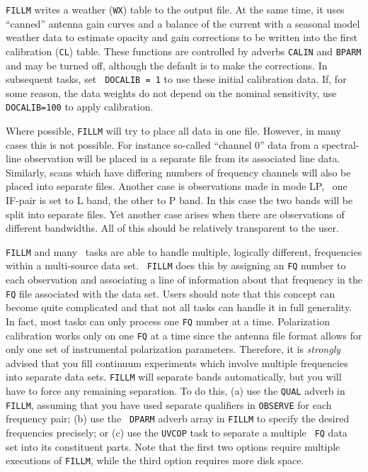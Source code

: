       {\tt FILLM} writes a weather ({\tt WX}) table to the output
file.  At the same time, it uses ``canned''  antenna gain
curves and a balance of the current with a seasonal model weather data
to estimate opacity and gain corrections to be written into the first
calibration ({\tt CL}) table.  These functions are controlled by
adverbs {\tt CALIN} and {\tt BPARM} and may be turned off, although
the default is to make the corrections. In subsequent tasks, set {\tt
DOCALIB = 1} to use these initial calibration data.  If, for some
reason, the data weights do not depend on the nominal sensitivity, use
{\tt DOCALIB=100} to apply calibration.

     Where possible, {\tt FILLM} will try to place all data in one
file.  However, in many cases this is not possible.  For instance
so-called ``channel 0'' data from a spectral-line observation will be
placed in a separate file from its associated line data.  Similarly,
scans which have differing numbers of frequency channels will also be
placed into separate files.  Another case is observations made in mode
LP, \ie\ one IF-pair is set to L band, the other to P band. In this
case the two bands will be split into separate files.  Yet another
case arises when there are observations of different bandwidths. All
of this should be relatively transparent to the user.

     {\tt FILLM} and many \AIPS\ tasks are able to handle multiple,
logically different, frequencies within a multi-source data set.  {\tt
FILLM} does this by assigning an {\tt FQ} number to each observation
 and associating a line of information about that
frequency in the {\tt FQ} file associated with the data set.  Users
should note that this concept can become quite complicated and that
not all tasks can handle it in full generality.  In fact, most tasks
can only process one {\tt FQ} number at a time.  Polarization
calibration works only on one {\tt FQ} at a time since the antenna
file format allows for only one set of instrumental polarization
parameters.  Therefore, it is {\it strongly\/} advised that you fill
continuum experiments which involve multiple frequencies into separate
data sets.  {\tt FILLM} will separate bands automatically, but you
will have to force any remaining separation.  To do this, (a) use the
{\tt QUAL} adverb in {\tt FILLM}, assuming that you have used separate
qualifiers in {\tt OBSERVE} for each frequency pair; (b) use the {\tt
DPARM} adverb array in {\tt FILLM} to specify the desired frequencies
precisely; or (c) use the {\tt UVCOP} task to separate a multiple {\tt
FQ} data set into its constituent parts.  Note that the first two
options require multiple executions of {\tt FILLM}, while the third
option requires more disk space.

